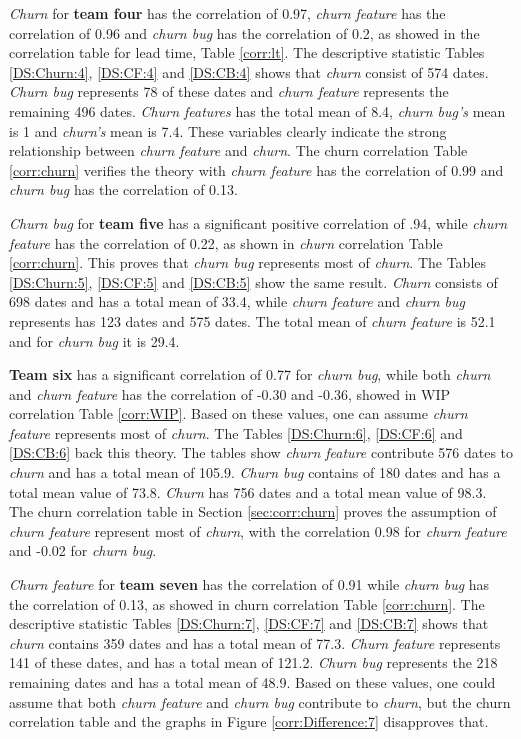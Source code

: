 \documentclass[UKenglish]{ifimaster}  %
\begin{document}
\textit{Churn} for \textbf{team four} has the correlation of 0.97, \textit{churn feature} has the correlation of 0.96 and  \textit{churn bug} has the correlation of 0.2, as showed in the correlation table for lead time, Table \ref{corr:lt}. The descriptive statistic Tables \ref{DS:Churn:4}, \ref{DS:CF:4} and \ref{DS:CB:4} shows that \textit{churn} consist of 574 dates. \textit{Churn bug} represents 78 of these dates and \textit{churn feature} represents the remaining 496 dates. \textit{Churn features} has the total mean of 8.4, \textit{churn bug's} mean is 1 and \textit{churn's} mean is 7.4. These variables clearly indicate the strong relationship between \textit{churn feature} and \textit{churn}. The churn correlation Table \ref{corr:churn} verifies the theory with \textit{churn feature} has the correlation of 0.99 and \textit{churn bug} has the correlation of 0.13.

\textit{Churn bug} for \textbf{team five} has a significant positive correlation of .94, while \textit{churn feature} has the correlation of 0.22, as shown in \textit{churn} correlation Table \ref{corr:churn}. This proves that \textit{churn bug} represents most of \textit{churn}. The Tables \ref{DS:Churn:5}, \ref{DS:CF:5} and \ref{DS:CB:5} show the same result. \textit{Churn} consists of 698 dates and has a total mean of 33.4, while \textit{churn feature} and \textit{churn bug} represents has 123 dates and 575 dates. The total mean of \textit{churn feature} is 52.1 and for \textit{churn bug} it is 29.4. 


\textbf{Team six} has a significant correlation of 0.77 for \textit{churn bug}, while both \textit{churn} and \textit{churn feature} has the correlation of -0.30 and -0.36, showed in WIP correlation Table \ref{corr:WIP}. Based on these values, one can assume \textit{churn feature} represents most of \textit{churn}. The Tables \ref{DS:Churn:6}, \ref{DS:CF:6} and \ref{DS:CB:6} back this theory. The tables show \textit{churn feature} contribute 576 dates to \textit{churn} and has a total mean of 105.9. \textit{Churn bug} contains of 180 dates and has a total mean value of 73.8. \textit{Churn} has 756 dates and a total mean value of 98.3.  The churn correlation table in Section \ref{sec:corr:churn} proves the assumption of \textit{churn feature} represent most of \textit{churn}, with the correlation 0.98 for  \textit{churn feature} and -0.02 for \textit{churn bug}.

\textit{Churn feature} for \textbf{team seven} has the correlation of 0.91 while \textit{churn bug} has the correlation of 0.13, as showed in {churn} correlation Table \ref{corr:churn}. The descriptive statistic Tables \ref{DS:Churn:7}, \ref{DS:CF:7} and \ref{DS:CB:7} shows that \textit{churn} contains 359 dates and has a total mean of 77.3.  \textit{Churn feature} represents 141 of these dates, and has a total mean of 121.2. \textit{Churn bug} represents the 218 remaining dates and has a total mean of 48.9. Based on these values, one could assume that both  \textit{churn feature} and  \textit{churn bug} contribute to  \textit{churn}, but the churn correlation table  and  the graphs in Figure \ref{corr:Difference:7} disapproves that.
\end{document}
